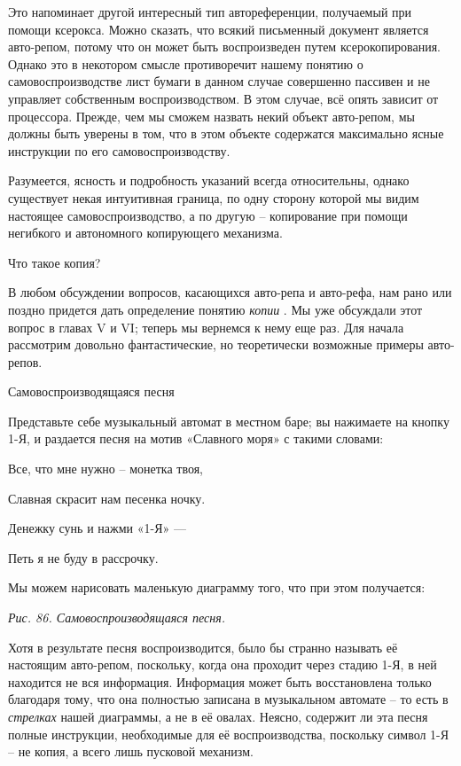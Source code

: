 \documentclass[../main.tex]{subfiles}
\begin{document}
Это напоминает другой интересный тип автореференции, получаемый при помощи ксерокса. Можно сказать, что всякий письменный документ является авто-репом, потому что он может быть воспроизведен путем ксерокопирования. Однако это в некотором смысле противоречит нашему понятию о самовоспроизводстве лист бумаги в данном случае совершенно пассивен и не управляет собственным воспроизводством. В этом случае, всё опять зависит от процессора. Прежде, чем мы сможем назвать некий объект авто-репом, мы должны быть уверены в том, что в этом объекте содержатся максимально ясные инструкции по его самовоспроизводству.

Разумеется, ясность и подробность указаний всегда относительны, однако существует некая интуитивная граница, по одну сторону которой мы видим настоящее самовоспроизводство, а по другую \--- копирование при помощи негибкого и автономного копирующего механизма.

Что такое копия?

В любом обсуждении вопросов, касающихся авто-репа и авто-рефа, нам рано или поздно придется дать определение понятию \emph{копии} . Мы уже обсуждали этот вопрос в главах V и VI; теперь мы вернемся к нему еще раз. Для начала рассмотрим довольно фантастические, но теоретически возможные примеры авто-репов.

Самовоспроизводящаяся песня

Представьте себе музыкальный автомат в местном баре; вы нажимаете на кнопку 1-Я, и раздается песня на мотив «Славного моря» с такими словами:

Все, что мне нужно \--- монетка твоя,

Славная скрасит нам песенка ночку.

Денежку сунь и нажми «1-Я» ---

Петь я не буду в рассрочку.

Мы можем нарисовать маленькую диаграмму того, что при этом получается:

\emph{Рис. 86. Самовоспроизводящаяся песня.}

Хотя в результате песня воспроизводится, было бы странно называть её настоящим авто-репом, поскольку, когда она проходит через стадию 1-Я, в ней находится не вся информация. Информация может быть восстановлена только благодаря тому, что она полностью записана в музыкальном автомате \--- то есть в \emph{стрелках} нашей диаграммы, а не в её овалах. Неясно, содержит ли эта песня полные инструкции, необходимые для её воспроизводства, поскольку символ 1-Я \--- не копия, а всего лишь пусковой механизм.
\end{document}
